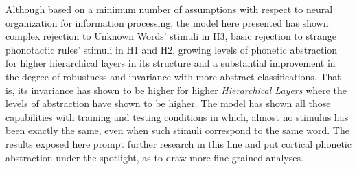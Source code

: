 \documentclass[11pt,a4paper]{article}
\begin{document}
Although based on a minimum number of assumptions with respect to
neural organization for information processing, the model here
presented has shown
complex rejection to Unknown Words' stimuli in H3,
basic rejection to strange phonotactic rules' stimuli in H1 and H2,
growing levels of phonetic abstraction for higher hierarchical
layers in its structure and a
substantial improvement in the degree of robustness and
invariance with more abstract classifications.
That is, its invariance has shown to be higher
for higher \textit{Hierarchical Layers} where the levels of abstraction
have shown to be higher.
The model has shown all those capabilities with training and testing
conditions in which, almost no stimulus has been exactly the same,
even when such stimuli correspond to the same word.
The results exposed here prompt further research in this line
and put cortical phonetic abstraction under the spotlight, as to draw
more fine-grained analyses.\\
\end{document}
